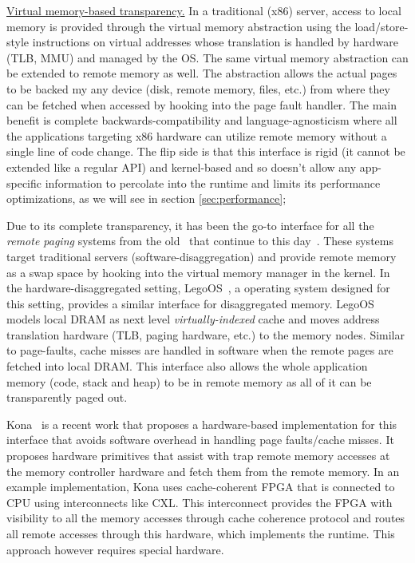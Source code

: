 \vspace{5pt}
\noindent \uline{Virtual memory-based transparency.}
In a traditional (x86) server, access to local memory is 
provided through the virtual memory abstraction using 
the load/store-style instructions on virtual addresses 
whose translation is handled by hardware (TLB, MMU) and 
managed by the OS. The same virtual memory abstraction can 
be extended to remote memory as well. The abstraction 
allows the actual pages to be backed my any device 
(disk, remote memory, files, etc.) from where they can 
be fetched when accessed by hooking into the page fault 
handler. The main benefit is complete backwards-compatibility 
and language-agnosticism where all the applications 
targeting x86 hardware can utilize  
remote memory without a single line of code change. The flip side 
is that this interface is rigid (it cannot be extended like a
regular API) and kernel-based and so doesn't allow any 
app-specific information to percolate into the runtime and 
limits its performance optimizations, as we will see in 
section \ref{sec:performance};


Due to its complete transparency, it has been the 
go-to interface for all the \textit{remote paging} systems 
from the old~\cite{gms,cashmere} that continue to this
day~\cite{infiniswap,fastswap,zswap,leap}.
These systems target traditional servers 
(software-disaggregation) and provide remote memory as a swap 
space by hooking into the virtual memory manager in the kernel.
In the hardware-disaggregated setting, LegoOS~\cite{legoos}, a 
operating system designed for this setting, provides a similar 
interface for disaggregated memory. LegoOS models local DRAM as
next level \textit{virtually-indexed} cache and moves address 
translation hardware (TLB, paging hardware, etc.) to the memory
nodes. Similar to page-faults, cache misses are handled in 
software when the remote pages are fetched into local DRAM.
This interface also allows the whole application memory 
(code, stack and heap) to be in remote memory as all of it 
can be transparently paged out.

Kona~\cite{kona} is a recent work that proposes a hardware-based 
implementation for this interface that avoids software overhead in
handling page faults/cache misses. It proposes hardware primitives 
that assist with trap remote memory accesses at the memory controller 
hardware and fetch them from the remote memory. In an example 
implementation, Kona uses cache-coherent FPGA that is connected to 
CPU using interconnects like CXL\cite{ccix}. This 
interconnect provides the FPGA with visibility to all the memory 
accesses through cache coherence protocol and routes all remote 
accesses through this hardware, which implements the runtime. 
This approach however requires special hardware.

